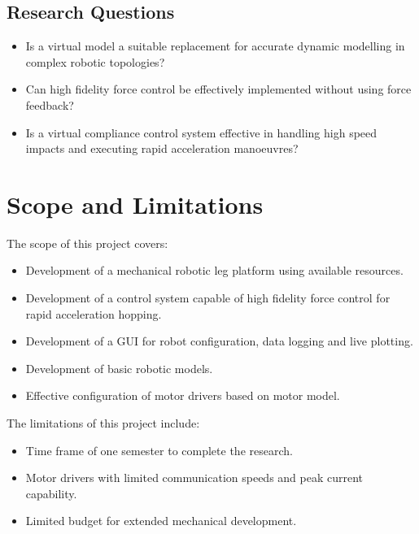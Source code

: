 \subsection{Research Questions}
\begin{itemize}
\item Is a virtual model a suitable replacement for accurate dynamic modelling in complex robotic topologies? 
\item Can high fidelity force control be effectively implemented without using force feedback?
\item Is a virtual compliance control system effective in handling high speed impacts and executing rapid acceleration manoeuvres?
\end{itemize}

\section{Scope and Limitations}
The scope of this project covers:
\begin{itemize}
\item Development of a mechanical robotic leg platform using available resources.
\item Development of a control system capable of high fidelity force control for rapid acceleration hopping.
\item Development of a GUI for robot configuration, data logging and live plotting.
\item Development of basic robotic models.
\item Effective configuration of motor drivers based on motor model.
\end{itemize}

The limitations of this project include:
\begin{itemize}
\item Time frame of one semester to complete the research.
\item Motor drivers with limited communication speeds and peak current capability.
\item Limited budget for extended mechanical development.
\end{itemize}

